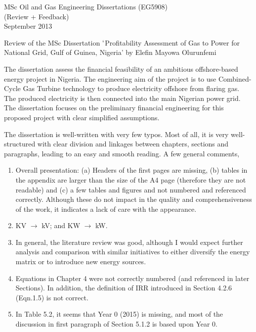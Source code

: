 \documentclass[14pt,twoside]{report}
\begin{document}
\clearpage


\begin{center}
\Huge{MSc Oil and Gas Engineering Dissertations (EG5908)}\\
\huge{(Review + Feedback)}\\
\huge{September 2013}
\end{center}

\vfill

\clearpage



\bigskip

\begin{center}
{\Large Review of the MSc Dissertation $\lq$Profitability Assessment of Gas to Power for National Grid, Gulf of Guinea, Nigeria' by Elefin Mayowa Olurunfemi}
\end{center}

\medskip

The dissertation assess the financial feasibility of an ambitious offshore-based energy project in Nigeria. The engineering aim of the project is to use Combined-Cycle Gas Turbine technology to produce electricity offshore from flaring gas. The produced electricity is then connected into the main Nigerian power grid. The dissertation focuses on the preliminary financial engineering for this proposed project with clear simplified assumptions.

The dissertation is well-written with very few typos. Most of all, it is very well-structured with clear division and linkages between chapters, sections and paragraphs, leading to an easy and smooth reading. A few general comments,
\begin{enumerate}
\item Overall presentation: (a) Headers of the first pages are missing, (b) tables in the appendix are larger than the size of the A4 page (therefore they are not readable) and (c) a few tables and figures and not numbered and referenced correctly. Although these do not impact in the quality and comprehensiveness of the work, it indicates a lack of care with the appearance.  
\item KV $\rightarrow$ kV; and KW $\rightarrow$ kW.
\item In general, the literature review was good, although I would expect further analysis and comparison with similar initiatives to either diversify the energy matrix or to introduce new energy sources.
\item Equations in Chapter 4 were not correctly numbered (and referenced in later Sections). In addition, the definition of IRR introduced in Section 4.2.6 (Eqn.1.5) is not correct.
\item In Table 5.2, it seems that Year 0 (2015) is missing, and most of the discussion in first paragraph of Section 5.1.2 is based upon Year 0. 
\end{enumerate}
\end{document}
